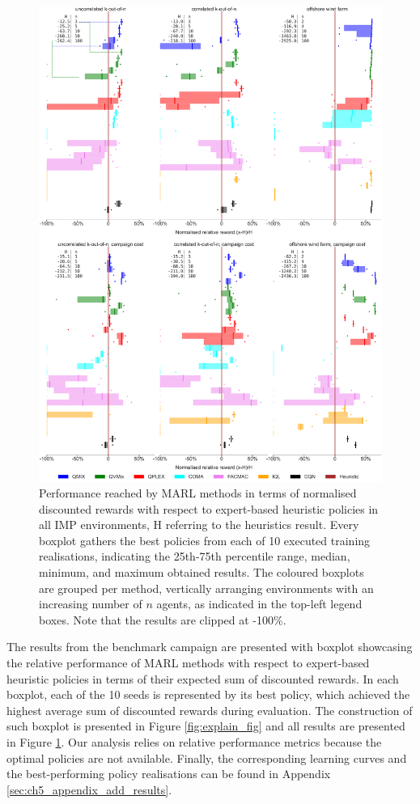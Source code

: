 \begin{figure}
    \centering
    \includegraphics[width=.86\textwidth]{tex_thesis/figures/ch5/boxplot_perc_limit.pdf}
\caption{Performance reached by MARL methods in terms of normalised discounted rewards with respect to expert-based heuristic policies in all IMP environments, H referring to the heuristics result.
Every boxplot gathers the best policies from each of 10 executed training realisations, indicating the 25th-75th percentile range, median, minimum, and maximum obtained results.
The coloured boxplots are grouped per method, vertically arranging environments with an increasing number of $n$ agents, as indicated in the top-left legend boxes.
Note that the results are clipped at -100\%.
}
\label{fig:results}
\end{figure}

The results from the benchmark campaign are presented with boxplot showcasing the relative performance of MARL methods with respect to expert-based heuristic policies in terms of their expected sum of discounted rewards.
In each boxplot, each of the 10 seeds is represented by its best policy, which achieved the highest average sum of discounted rewards during evaluation.
The construction of such boxplot is presented in Figure \ref{fig:explain_fig} and all results are presented in Figure \ref{fig:results}.
Our analysis relies on relative performance metrics because the optimal policies are not available.
Finally, the corresponding learning curves and the best-performing policy realisations can be found in Appendix \ref{sec:ch5_appendix_add_results}.

